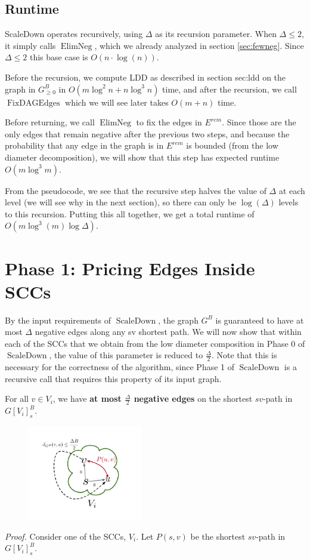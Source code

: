 \documentclass[11pt]{article}
\newcommand{\ElimNeg}{\operatorname{ElimNeg}}
\newcommand{\SPaverage}{\ElimNeg}
\newcommand{\ScaleDown}{\operatorname{ScaleDown}}
\newcommand{\FixAlmostDag}{\operatorname{FixDAGEdges}}
\newcommand{\esep}{E^{rem}}
\newcommand{\GB}{G^{B}}
\begin{document}
\subsection{Runtime}
\label{sec:scaledownruntime}
ScaleDown operates recursively, using $\Delta$ as its recursion parameter. When $\Delta \leq 2$, it simply calls $\SPaverage$, which we already analyzed in section \ref{sec:fewneg}. Since $\Delta \leq 2$ this base case is $O(n \cdot \log(n))$.

Before the recursion, we compute LDD as described in section {sec:ldd} on the graph in $\GB_{\geq 0}$ in $O(m\log^2 n+n\log^3 n)$ time, and after the recursion, we call $\FixAlmostDag$ which we will see later takes $O(m + n)$ time.

Before returning, we call $\SPaverage$ to fix the edges in $\esep$. Since those are the only edges that remain negative after the previous two steps, and because the probability that any edge in the graph is in $\esep$ is bounded (from the low diameter decomposition), we will show that this step has expected runtime $O(m \log^3 m)$.

From the pseudocode, we see that the recursive step halves the value of $\Delta$ at each level (we will see why in the next section), so there can only be $\log(\Delta)$ levels to this recursion. Putting this all together, we get a total runtime of $O\left(m \log^3 (m) \log \Delta \right)$.

\section{Phase 1: Pricing Edges Inside SCCs}
By the input requirements of $\ScaleDown$, the graph $\GB$ is guaranteed to have at most $\Delta$ negative edges along any sv shortest path.
We will now show that within each of the SCCs that we obtain from the low diameter composition in Phase 0 of $\ScaleDown$, the value of this parameter is reduced to $\frac{\Delta}{2}$.
Note that this is necessary for the correctness of the algorithm, since Phase 1 of $\ScaleDown$ is a recursive call that requires this property of its input graph.

\begin{lemma}
    For all $v \in V_i$, we have \textbf{at most $\frac{\Delta}{2}$ negative edges} on the shortest $sv$-path in $G[V_i]^B_s$.
\end{lemma}

\begin{figure}
    \includegraphics[width=5cm]{images/phase1-2.pdf}
\end{figure}
\textit{Proof.} Consider one of the SCCs, $V_i$. Let $P(s,v)$ be the shortest $sv$-path in $G[V_i]^B_s$.
\end{document}
